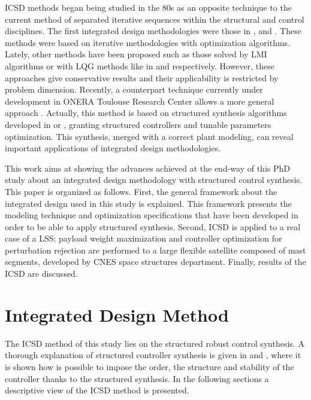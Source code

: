 \documentclass{ifacconf}
\begin{document}
ICSD methods began being studied in the 80s as an opposite technique to the current method of separated iterative sequences within the structural and control disciplines. The first integrated design methodologies were those in \cite{Haftka1987_ID}, \cite{Gilbert1988_ID} and \cite{Messac1992_ID}. These methods were based on iterative methodologies with optimization algorithms. Lately, other methods have been proposed such as those solved by LMI algorithms or with LQG methods like in \cite{Hiramoto2009_ID} and \cite{Cimellaro2008_ID} respectively. However, these approaches give conservative results and their applicability is restricted by problem dimension. Recently, a counterpart technique currently under development in ONERA Toulouse Research Center allows a more general approach \citep{Alazard2013_ID}.  Actually, this method is based on structured  synthesis algorithms developed in \cite{Gahinet2011_Hinf} or \cite{Burke2006_Hinf}, granting structured controllers and tunable parameters optimization. This synthesis, merged with a correct plant modeling, can reveal important applications of integrated design methodologies.

This work aims at showing the advances achieved at the end-way of this PhD study about an integrated design methodology with structured  control synthesis. This paper is organized as follows. First, the general framework about the integrated design used in this study is explained. This framework presents the modeling technique and optimization specifications that have been developed in order to be able to apply structured  synthesis. Second, ICSD is applied to a real case of a LSS: payload weight maximization and controller optimization for perturbation rejection are performed to a large flexible satellite composed of mast segments, developed by CNES space structures department. Finally, results of the ICSD are discussed.

\section{Integrated Design Method}
\label{sec:Method}

The ICSD method of this study lies on the structured robust control synthesis. A thorough explanation of structured  controller synthesis is given in \cite{Gahinet2011_Hinf} and \cite{Burke2006_Hinf}, where it is shown how is possible to impose the order, the structure and stability of the controller thanks to the structured  synthesis. In the following sections a descriptive view of the ICSD method is presented.
\end{document}
